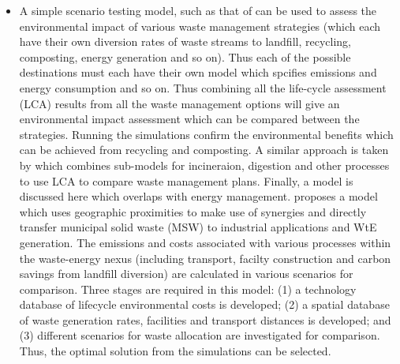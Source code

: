 \begin{itemize}
	\item A simple scenario testing model, such as that of \citet{Bovea2006} can be used to assess the environmental impact of various waste management strategies (which each have their own diversion rates of waste streams to landfill, recycling, composting, energy generation and so on). Thus each of the possible destinations must each have their own model which spcifies emissions and energy consumption and so on. Thus combining all the life-cycle assessment (LCA) results from all the waste management options will give an environmental impact assessment which can be compared between the strategies. Running the simulations confirm the environmental benefits which can be achieved from recycling and composting. A similar approach is taken by \citet{Eriksson2002} which combines sub-models for incineraion, digestion and other processes to use LCA to compare waste management plans. Finally, a model is discussed here which overlaps with energy management. \citet{Geng2010} proposes a model which uses geographic proximities to make use of synergies and directly transfer municipal solid waste (MSW) to industrial applications and WtE generation. The emissions and costs associated with various processes within the waste-energy nexus (including transport, facilty construction and carbon savings from landfill diversion) are calculated in various scenarios for comparison. Three stages are required in this model: (1) a technology database of lifecycle environmental costs is developed; (2) a spatial database of waste generation rates, facilities and transport distances is developed; and (3) different scenarios for waste allocation are investigated for comparison. Thus, the optimal solution from the simulations can be selected.

\end{itemize}
